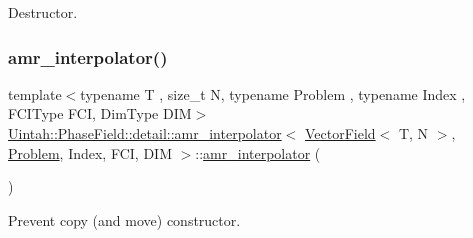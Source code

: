 Destructor. 

\mbox{\label{classUintah_1_1PhaseField_1_1detail_1_1amr__interpolator_3_01VectorField_3_01T_00_01N_01_4_00_01ab3739ebd28e1ffb5bc0b138cfaddd80_a1f75287ee5fc8828e84fa530fb779e47}} 
\subsubsection{\texorpdfstring{amr\+\_\+interpolator()}{amr\_interpolator()}\hspace{0.1cm}{\footnotesize\ttfamily [3/3]}}
{\footnotesize\ttfamily template$<$typename T , size\+\_\+t N, typename Problem , typename Index , F\+C\+I\+Type F\+CI, Dim\+Type D\+IM$>$ \\
\hyperlink{classUintah_1_1PhaseField_1_1detail_1_1amr__interpolator}{Uintah\+::\+Phase\+Field\+::detail\+::amr\+\_\+interpolator}$<$ \hyperlink{structUintah_1_1PhaseField_1_1VectorField}{Vector\+Field}$<$ T, N $>$, \hyperlink{classUintah_1_1PhaseField_1_1Problem}{Problem}, Index, F\+CI, D\+IM $>$\+::\hyperlink{classUintah_1_1PhaseField_1_1detail_1_1amr__interpolator}{amr\+\_\+interpolator} (\begin{DoxyParamCaption}\item[{const \hyperlink{classUintah_1_1PhaseField_1_1detail_1_1amr__interpolator}{amr\+\_\+interpolator}$<$ \hyperlink{structUintah_1_1PhaseField_1_1VectorField}{Vector\+Field}$<$ T, N $>$, \hyperlink{classUintah_1_1PhaseField_1_1Problem}{Problem}, Index, F\+CI, D\+IM $>$ \&}]{ }\end{DoxyParamCaption})\hspace{0.3cm}{\ttfamily [delete]}}



Prevent copy (and move) constructor. 



